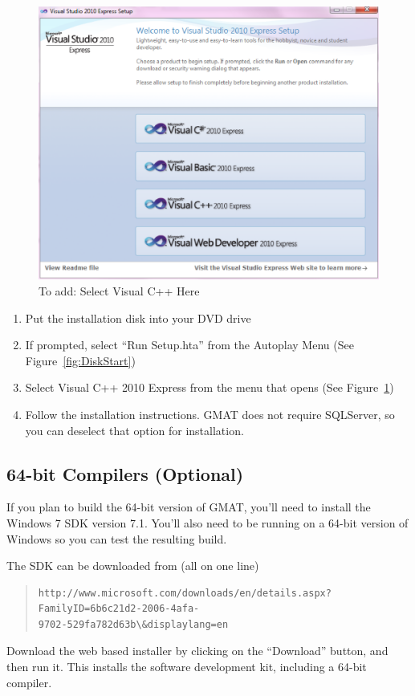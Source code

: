 \documentclass[letterpaper,10pt]{article}%
\begin{document}
\begin{figure}
	\centering
		\includegraphics[scale=0.5]{VisualCpp.eps}
	\caption{To add: Select Visual C++ Here}
	\label{fig:VisualCpp}
\end{figure}

\begin{enumerate}
\item Put the installation disk into your DVD drive
\item If prompted, select ``Run Setup.hta'' from the Autoplay Menu (See Figure~\ref{fig:DiskStart})
\item Select Visual C++ 2010 Express from the menu that opens (See Figure~\ref{fig:VisualCpp})
\item Follow the installation instructions.  GMAT does not require SQLServer, so you can deselect that option for installation.
\end{enumerate}

\subsection{64-bit Compilers (Optional)}

If you plan to build the 64-bit version of GMAT, you'll need to install the Windows 7 SDK version 7.1.  You'll also need to be running on a 64-bit version of Windows so you can test the resulting build.

The SDK can be downloaded from (all on one line)
\begin{quote}
\begin{verbatim}
http://www.microsoft.com/downloads/en/details.aspx?FamilyID=6b6c21d2-2006-4afa-
9702-529fa782d63b\&displaylang=en
\end{verbatim}
\end{quote}
\noindent Download the web based installer by clicking on the ``Download'' button, and then run it.  This installs the software development kit, including a 64-bit compiler.
\end{document}
